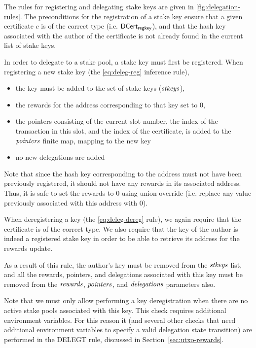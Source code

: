 The rules for registering and delegating stake keys are given in
\cref{fig:delegation-rules}. The preconditions for the registration of a stake
key ensure that a given certificate $c$ is of the correct type
(i.e. $\mathsf{DCert_{regkey}}$),
and that the hash key associated with the author of the certificate is not
already found in the current list of stake keys.

In order to delegate to a stake pool, a stake key must first be registered.
When registering a new stake key (the \cref{eq:deleg-reg} inference rule),

\begin{itemize}
\item the key must be
added to the set of stake keys ($\mathit{stkeys}$),
\item the rewards for the address
corresponding to that key set to 0,
\item the pointers consisting of the current slot number, the
index of the transaction in this slot, and the index of the certificate, is
added to the $\mathit{pointers}$ finite map, mapping to the new key
\item no new delegations are added
\end{itemize}

Note that
since the hash key corresponding to the address must not have been previously
registered,
it should not have any rewards in its associated address. Thus, it is safe
to set the rewards to 0 using union override (i.e. replace any value previously
associated with this address with 0).

When deregistering a key (the \cref{eq:deleg-dereg} rule), we again
require that the certificate is of the correct type. We also require
that the key of the author is indeed a registered stake key
in order to be able to retrieve its address for the rewards update.

As a result of this rule, the author's key must be removed from the $\mathit{stkeys}$ list,
and all the rewards, pointers, and delegations associated with this key must be removed
from the $\mathit{rewards}$, $\mathit{pointers}$, and $\mathit{delegations}$ parameters also.

Note that we must only allow performing a key deregistration when there
are no active stake pools associated with this key. This check requires additional
environment variables. For this reason
it (and several other checks that need
additional environment variables to specify a valid delegation state transition)
are performed in the DELEGT rule, discussed in Section~\ref{sec:utxo-rewards}.

